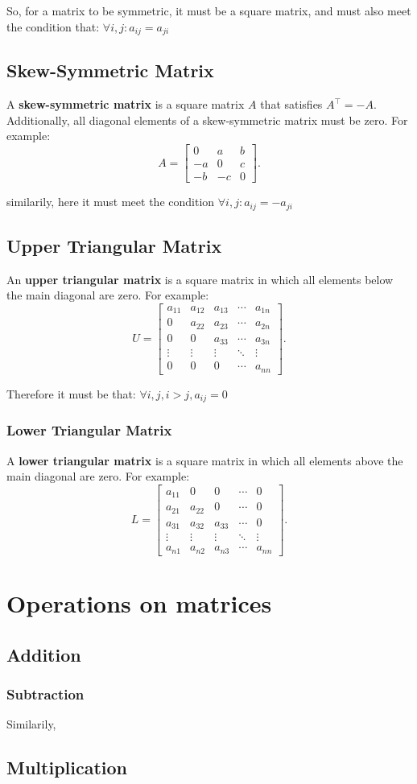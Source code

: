 \documentclass{article}
\begin{document}
So, for a matrix to be symmetric, it must be a square matrix, and must also meet the condition that:
$\forall i,j: a_{ij} =a_{ji}$

\subsection{Skew-Symmetric Matrix}
A \textbf{skew-symmetric matrix} is a square matrix $A$ that satisfies $A^\top = -A$. Additionally, all diagonal elements of a skew-symmetric matrix must be zero. For example:
\[
A =
\begin{bmatrix}
0 & a & b \\
-a & 0 & c \\
-b & -c & 0
\end{bmatrix}.
\]

similarily, here it must meet the condition
$\forall i,j: a_{ij} =-a_{ji}$

\subsection{Upper Triangular Matrix}
An \textbf{upper triangular matrix} is a square matrix in which all elements below the main diagonal are zero. For example:
\[
U =
\begin{bmatrix}
a_{11} & a_{12} & a_{13} & \cdots & a_{1n} \\
0 & a_{22} & a_{23} & \cdots & a_{2n} \\
0 & 0 & a_{33} & \cdots & a_{3n} \\
\vdots & \vdots & \vdots & \ddots & \vdots \\
0 & 0 & 0 & \cdots & a_{nn}
\end{bmatrix}.
\]

Therefore it must be that:
$\forall i,j, i>j, a_{ij} = 0$

\subsubsection{Lower Triangular Matrix}
A \textbf{lower triangular matrix} is a square matrix in which all elements above the main diagonal are zero. For example:
\[
L =
\begin{bmatrix}
a_{11} & 0 & 0 & \cdots & 0 \\
a_{21} & a_{22} & 0 & \cdots & 0 \\
a_{31} & a_{32} & a_{33} & \cdots & 0 \\
\vdots & \vdots & \vdots & \ddots & \vdots \\
a_{n1} & a_{n2} & a_{n3} & \cdots & a_{nn}
\end{bmatrix}.
\]
\section{Operations on matrices}

\subsection{Addition}

\subsubsection{Subtraction}

Similarily,

\subsection{Multiplication}
\end{document}
